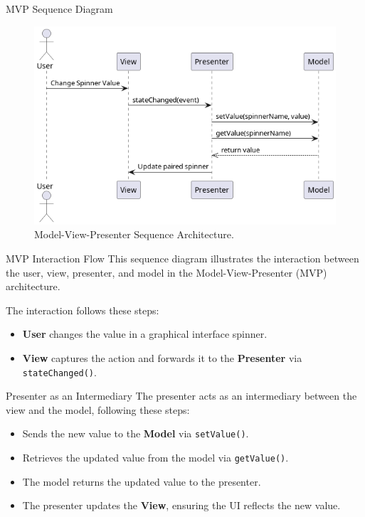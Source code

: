 \documentclass[aspectratio=169, table]{beamer}
\begin{document}
\begin{frame}[fragile]{MVP Sequence Diagram}
	\vspace{20pt}
	\begin{figure}[h]
		\centering
		\includegraphics[width=.66\textwidth]{../images/out/mvp-sequence.png}
		\caption{Model-View-Presenter Sequence Architecture.}
		\label{fig:mvp-sequence}
	\end{figure}
\end{frame}

\begin{frame}[fragile]{MVP Interaction Flow}
	\vspace{20pt}
	This sequence diagram illustrates the interaction between the user, view, presenter, and model in the Model-View-Presenter (MVP) architecture.
	
	The interaction follows these steps:
	\begin{itemize}
		\item \textbf{User} changes the value in a graphical interface spinner.
		\item \textbf{View} captures the action and forwards it to the \textbf{Presenter} via \texttt{stateChanged()}.
	\end{itemize}
\end{frame}

\begin{frame}[fragile]{Presenter as an Intermediary}
	\vspace{20pt}
	The presenter acts as an intermediary between the view and the model, following these steps:
	\begin{itemize}
		\item Sends the new value to the \textbf{Model} via \texttt{setValue()}.
		\item Retrieves the updated value from the model via \texttt{getValue()}.
		\item The model returns the updated value to the presenter.
		\item The presenter updates the \textbf{View}, ensuring the UI reflects the new value.
	\end{itemize}
\end{frame}
\end{document}
